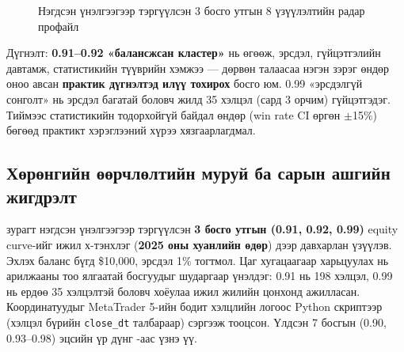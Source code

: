\begin{figure}[H]
\caption{Нэгдсэн үнэлгээгээр тэргүүлсэн 3 босго утгын 8 үзүүлэлтийн радар профайл}
\label{fig:radar_profiles}
\end{figure}

Дүгнэлт: \textbf{0.91--0.92 «балансжсан кластер»} нь өгөөж, эрсдэл, гүйцэтгэлийн давтамж, статистикийн түүврийн хэмжээ — дөрвөн талаасаа нэгэн зэрэг өндөр оноо авсан \textbf{практик дүгнэлтэд илүү тохирох} босго юм. 0.99 «эрсдэлгүй сонголт» нь эрсдэл багатай боловч жилд 35 хэлцэл (сард 3 орчим) гүйцэтгэдэг. Тиймээс статистикийн тодорхойгүй байдал өндөр (win rate CI өргөн $\pm$15\%) бөгөөд практикт хэрэглээний хүрээ хязгаарлагдмал.

\subsection{Хөрөнгийн өөрчлөлтийн муруй ба сарын ашгийн жигдрэлт}

 зурагт нэгдсэн үнэлгээгээр тэргүүлсэн \textbf{3 босго утгын (0.91, 0.92, 0.99)} equity curve-ийг ижил х-тэнхлэг (\textbf{2025 оны хуанлийн өдөр}) дээр давхарлан үзүүлэв. Эхлэх баланс бүгд \$10{,}000, эрсдэл 1\% тогтмол. Цаг хугацаагаар харьцуулах нь арилжааны тоо ялгаатай босгуудыг шударгаар үнэлдэг: 0.91 нь 198 хэлцэл, 0.99 нь ердөө 35 хэлцэлтэй боловч хоёулаа ижил жилийн цонхонд ажилласан. Координатуудыг MetaTrader 5-ийн бодит хэлцлийн логоос Python скриптээр (хэлцэл бүрийн \texttt{close\_dt} талбараар) сэргээж тооцсон. Үлдсэн 7 босгын (0.90, 0.93--0.98) эцсийн үр дүнг -аас үзнэ үү.

